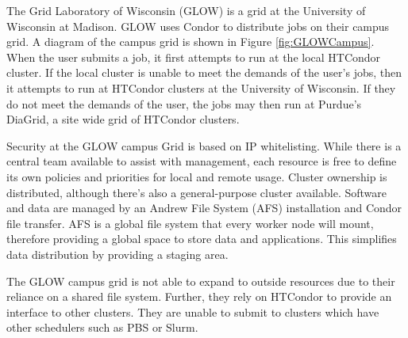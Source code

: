The Grid Laboratory of Wisconsin (GLOW) \cite{gridworkshopweb, glowwebsite} is a grid at the University of Wisconsin at Madison.  GLOW uses Condor to distribute 
jobs on their campus grid.  A diagram of the campus grid is shown in Figure \ref{fig:GLOWCampus}.  When the user submits a job, it first attempts to run at the local HTCondor cluster.  If the local cluster is unable to meet the demands of the user's jobs, then it attempts to run at HTCondor clusters at the University of Wisconsin.  If they do not meet the demands of the user, the jobs may then run at Purdue's DiaGrid, a site wide grid of HTCondor clusters.

Security at the GLOW campus Grid is based on IP whitelisting.  While there is a central 
team available to assist with management, each resource is free to define its own policies and priorities for local 
and remote usage.  Cluster ownership is distributed, although there's also a general-purpose cluster available.  
Software and data are managed by an Andrew File System (AFS) \cite{morris1986andrew} installation and Condor file transfer.  AFS is a global file system
that every worker node will mount, therefore providing a global space to store data and applications.  This simplifies data distribution
by providing a staging area.

The GLOW campus grid is not able to expand to outside resources due to their reliance on a shared file system.  Further, they rely on HTCondor to provide an interface to other clusters.  They are unable to submit to clusters which have other schedulers such as PBS or Slurm.  



